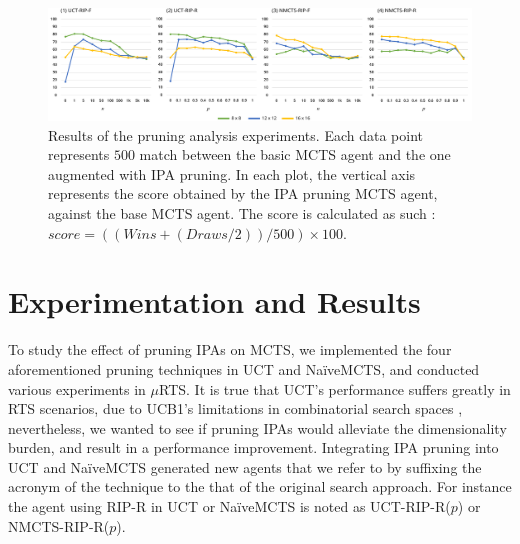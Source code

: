 \documentclass[conference]{IEEEtran}
\newcommand{\mRTS}{$\mu$RTS}
\begin{document}

\begin{figure}[!h]
\begin{center}
	\includegraphics[width=1\textwidth]{figs/PT-h.pdf}
	\caption{Results of the pruning analysis experiments. Each data point represents $500$ match between the basic MCTS agent and the one augmented with IPA pruning. In each plot, the vertical axis represents the score obtained by the IPA pruning MCTS agent, against the base MCTS agent. The score is calculated as such : $score = ((Wins + (Draws / 2)) / 500) \times 100$.}
	\label{PruningAnalysis}
\end{center}
\end{figure}



\section{Experimentation and Results}
\label{sec:experiments}


To study the effect of pruning IPAs on MCTS, we implemented the four aforementioned pruning techniques in UCT and NaïveMCTS, and conducted various experiments in \mRTS{}. It is true that UCT's performance suffers greatly in RTS scenarios, due to UCB1's limitations in combinatorial search spaces \cite{ontanon_combinatorial_2013}, nevertheless, we wanted to see if pruning IPAs would alleviate the dimensionality burden, and result in a performance improvement. Integrating IPA pruning into UCT and NaïveMCTS generated new agents that we refer to by suffixing the acronym of the technique to the that of the original search approach. For instance the agent using RIP-R in UCT or NaïveMCTS is noted as UCT-RIP-R($p$) or NMCTS-RIP-R($p$).
\end{document}
